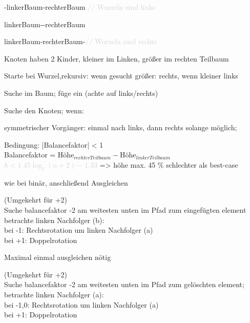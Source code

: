 

 -linkerBaum-rechterBaum \textcolor{lightgray}{// Wurzeln sind links}

 linkerBaum--rechterBaum

 linkerBaum-rechterBaum-\textcolor{lightgray}{// Wurzeln sind rechts}

Knoten haben 2 Kinder, kleiner im Linken, größer im rechten Teilbaum

Starte bei Wurzel,rekursiv:  wenn gesucht größer: rechts, wenn kleiner links
 
Suche im Baum; füge ein (achte auf links/rechts)
 
Suche den Knoten; wenn:


symmetrischer Vorgänger: einmal nach links, dann rechts solange möglich;

Bedingung: |Balancefaktor| < 1 \\
Balancefaktor = $\text{Höhe}_{rechter Teilbaum} - \text{Höhe}_{linker Teilbaum} $\\
\textcolor{lightgray}{$ h < 1.45 \log_2(n+2)-1.33$ }=> höhe max. 45 \% schlechter als best-case

 wie bei binär, anschließend Ausgleichen

(Umgekehrt für +2)\\
Suche balancefaktor -2 am weitesten unten im Pfad zum eingefügten element\\
betrachte linken Nachfolger (b):\\
bei -1: Rechtsrotation um linken Nachfolger (a)\\
bei +1: Doppelrotation

Maximal einmal ausgleichen nötig




(Umgekehrt für +2)\\
Suche balancefaktor -2 am weitesten unten im Pfad zum gelöschten element;\\
betrachte linken Nachfolger (a):\\
bei -1,0: Rechtsrotation um linken Nachfolger (a)\\
bei +1: Doppelrotation

